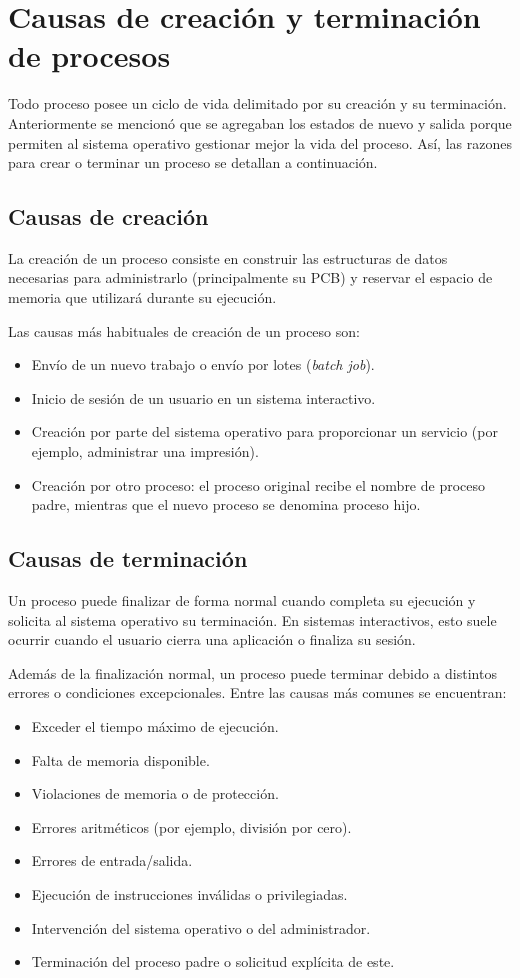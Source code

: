 \section{Causas de creación y terminación de procesos}
\label{ssec_creac_y_fin_procesos}

Todo proceso posee un ciclo de vida delimitado por su creación y su terminación. Anteriormente se mencionó que se agregaban los estados de nuevo y salida porque permiten al sistema operativo gestionar mejor la vida del proceso. Así, las razones para crear o terminar un proceso se detallan a continuación.

\subsection{Causas de creación}

La creación de un proceso consiste en construir las estructuras de datos necesarias para administrarlo (principalmente su PCB) y reservar el espacio de memoria que utilizará durante su ejecución.

Las causas más habituales de creación de un proceso son:
\begin{itemize}
  \item Envío de un nuevo trabajo o envío por lotes (\emph{batch job}).
  \item Inicio de sesión de un usuario en un sistema interactivo.
  \item Creación por parte del sistema operativo para proporcionar un servicio (por ejemplo, administrar una impresión).
  \item Creación por otro proceso: el proceso original recibe el nombre de proceso padre, mientras que el nuevo proceso se denomina proceso hijo.
\end{itemize}

\subsection{Causas de terminación}

Un proceso puede finalizar de forma normal cuando completa su ejecución y solicita al sistema operativo su terminación. En sistemas interactivos, esto suele ocurrir cuando el usuario cierra una aplicación o finaliza su sesión.

Además de la finalización normal, un proceso puede terminar debido a distintos errores o condiciones excepcionales. Entre las causas más comunes se encuentran:
\begin{itemize}
  \item Exceder el tiempo máximo de ejecución.
  \item Falta de memoria disponible.
  \item Violaciones de memoria o de protección.
  \item Errores aritméticos (por ejemplo, división por cero).
  \item Errores de entrada/salida.
  \item Ejecución de instrucciones inválidas o privilegiadas.
  \item Intervención del sistema operativo o del administrador.
  \item Terminación del proceso padre o solicitud explícita de este.
\end{itemize}
